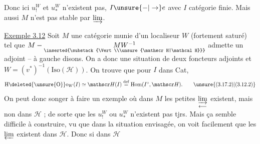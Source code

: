 Donc ici $u^W_!$ et $u^W_*$ n'existent pas, 
$I\unsure{-|\to}e$ avec $I$ catégorie finie. Mais
aussi $M$ n'est pas stable par  $\varinjlim$.

\uline{Exemple 3.12} Soit $M$ une catégorie munie
d'un localiseur $W$ (fortement saturé) tel
que $M-\underset{\inserted{\substack{\Vert\\\unsure{\mathscr H|\mathcal H}}}}{MW^{-1}}$ admette un adjoint
-- à gauche disons. On a donc une situation
de deux foncteurs adjoints
et $W=(v^*)^{-1}(\mathrm{Iso}(\mathscr H))$. On trouve
que pour  $I$ dans Cat, 
\[
 \mathrm H\deleted{\unsure{\mathrm O}}\mathrm o_W(I)\simeq\mathscr H(I)\overset{\mathrm{def}}{=}\mathrm{Hom}(I^\circ,\mathscr H).\tag*{\unsure{(3.17.2)|(3.12.2)}}
\]
On peut donc songer à faire un
exemple où dans $M$ les petites $\underset{\longleftarrow}{\varinjlim}$
existent, mais non dans $\mathscr H$ ; de sorte
que les $u^W_!$ ou $u^W_*$ n'existent pas
tjrs. Mais ça semble difficile à
construire, vu que dans la situation
envisagée, on voit facilement que les 
$\varprojlim$ existent dans $\mathscr H$. Donc si dans $\mathscr H$
